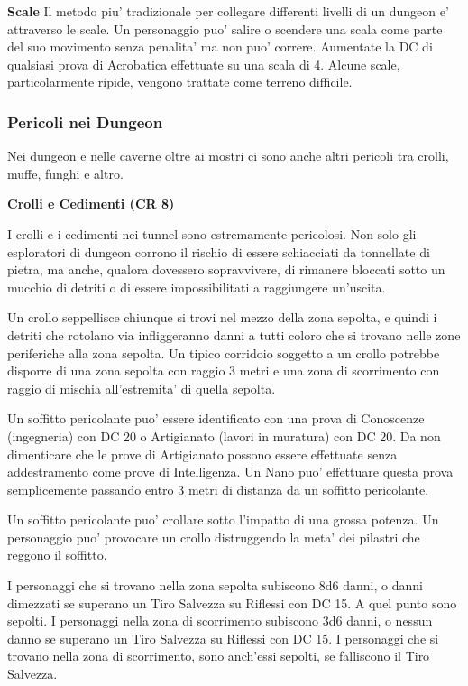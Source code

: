 \documentclass[a4paper,11pt,twoside,openany]{dndbook}
\begin{document}
{\textbf{Scale} Il metodo piu' tradizionale per collegare differenti livelli di un dungeon e' attraverso le scale. Un personaggio puo' salire o scendere una scala come parte del suo movimento senza penalita' ma non puo' correre. Aumentate la DC di qualsiasi prova di Acrobatica effettuate su una scala di 4. Alcune scale, particolarmente ripide, vengono trattate come terreno difficile.

\subsubsection{Pericoli nei Dungeon}

Nei dungeon e nelle caverne oltre ai mostri ci sono anche altri pericoli tra crolli, muffe, funghi e altro.

\textbf{Crolli e Cedimenti (CR 8)}

I crolli e i cedimenti nei tunnel sono estremamente pericolosi. Non solo gli esploratori di dungeon corrono il rischio di essere schiacciati da tonnellate di pietra, ma anche, qualora dovessero sopravvivere, di rimanere bloccati sotto un mucchio di detriti o di essere impossibilitati a raggiungere un'uscita.

Un crollo seppellisce chiunque si trovi nel mezzo della zona sepolta, e quindi i detriti che rotolano via infliggeranno danni a tutti coloro che si trovano nelle zone periferiche alla zona sepolta. Un tipico corridoio soggetto a un crollo potrebbe disporre di una zona sepolta con raggio 3 metri e una zona di scorrimento con raggio di mischia all'estremita' di quella sepolta.

Un soffitto pericolante puo' essere identificato con una prova di Conoscenze (ingegneria) con DC 20 o Artigianato (lavori in muratura) con DC 20. Da non dimenticare che le prove di Artigianato possono essere effettuate senza addestramento come prove di Intelligenza. Un Nano puo' effettuare questa prova semplicemente passando entro 3 metri di distanza da un soffitto pericolante. 

Un soffitto pericolante puo' crollare sotto l'impatto di una grossa potenza. Un personaggio puo' provocare un crollo distruggendo la meta' dei pilastri che reggono il soffitto.

I personaggi che si trovano nella zona sepolta subiscono 8d6 danni, o danni dimezzati se superano un Tiro Salvezza su Riflessi con DC 15. A quel punto sono sepolti. I personaggi nella zona di scorrimento subiscono 3d6 danni, o nessun danno se superano un Tiro Salvezza su Riflessi con DC 15. I personaggi che si trovano nella zona di scorrimento, sono anch'essi sepolti, se falliscono il Tiro Salvezza.

}
\end{document}
